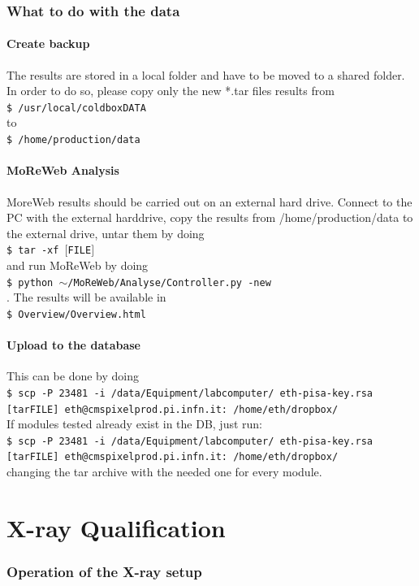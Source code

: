 \documentclass[fleqn,10pt]{SelfArx} %
\newcommand{\shellcmd}[1]{\\\indent\indent\texttt{\footnotesize\$ #1}\\}
\begin{document}
\section{What to do with the data}\label{postdata}
\subsection{Create backup}
The results are stored in a local folder and have to be moved to a shared folder. In order to do so, please copy only the new *.tar files results from 
\shellcmd{/usr/local/coldboxDATA} 
to
\shellcmd{/home/production/data}

\subsection{MoReWeb Analysis}
MoreWeb results should be carried out on an external hard drive. Connect to the PC with the external harddrive, copy the results from /home/production/data to the external drive, untar them by doing 
\shellcmd{tar -xf $[$FILE$]$}
and run MoReWeb by doing 
\shellcmd{python $\sim$/MoReWeb/Analyse/Controller.py -new}. 
The results will be available in 
\shellcmd {Overview/Overview.html}

\subsection{Upload to the database}
This can be done by doing 
\shellcmd{scp -P 23481 -i /data/Equipment/labcomputer/ eth-pisa-key.rsa [tarFILE] eth@cmspixelprod.pi.infn.it: /home/eth/dropbox/}

If modules tested already exist in the DB, just run:
\shellcmd{scp -P 23481 -i /data/Equipment/labcomputer/ eth-pisa-key.rsa [tarFILE] eth@cmspixelprod.pi.infn.it: /home/eth/dropbox/}
changing the tar archive with the needed one for every module.

\part{X-ray Qualification}

\section{Operation of the X-ray setup}
\end{document}

